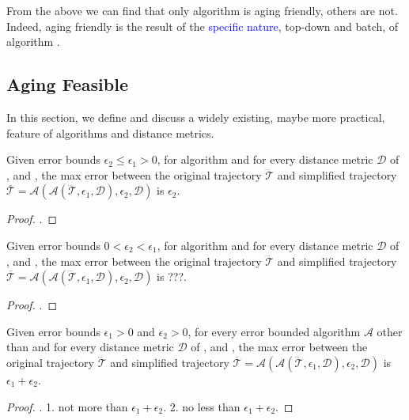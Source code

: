 From the above we can find that only algorithm \dpa is aging friendly, others are not. Indeed, {aging friendly} is the result of the \textcolor{blue}{specific nature}, \ie top-down and batch, of algorithm \dpa.


\subsection{Aging Feasible}
In this section, we define and discuss a widely existing, maybe more practical, feature of \lsa algorithms and distance metrics.


\begin{theorem}
	\label{theo-aging-dp}
	Given error bounds $\epsilon_2 \le \epsilon_1>0$, for \lsa algorithm \dpa and for every distance metric $\mathcal{D}$ of \ped, \sed and \dad, the max error between the original trajectory $\dddot{\mathcal{T}}$ and simplified trajectory $\overline{\mathcal{T}}=\mathcal{A}(\mathcal{A}(\dddot{\mathcal{T}}, \epsilon_1, \mathcal{D}), \epsilon_2, \mathcal{D})$ is $\epsilon_2$.
\end{theorem}

\begin{proof}
	\todo.
\end{proof}

\begin{theorem}
	\label{theo-aging-dp}
	Given error bounds $0<\epsilon_2< \epsilon_1$, for \lsa algorithm \dpa and for every distance metric $\mathcal{D}$ of \ped, \sed and \dad, the max error between the original trajectory $\dddot{\mathcal{T}}$ and simplified trajectory $\overline{\mathcal{T}}=\mathcal{A}(\mathcal{A}(\dddot{\mathcal{T}}, \epsilon_1, \mathcal{D}), \epsilon_2, \mathcal{D})$ is ???.
\end{theorem}

\begin{proof}
	\todo.
\end{proof}

\begin{theorem}
	\label{theo-aging-distance}
	Given error bounds $\epsilon_1>0$ and $\epsilon_2>0$, for every error bounded \lsa algorithm $\mathcal{A}$ other than \dpa and for every distance metric $\mathcal{D}$ of \ped, \sed and \dad, the max error between the original trajectory $\dddot{\mathcal{T}}$ and simplified trajectory $\overline{\mathcal{T}}=\mathcal{A}(\mathcal{A}(\dddot{\mathcal{T}}, \epsilon_1, \mathcal{D}), \epsilon_2, \mathcal{D})$ is $\epsilon_1+ \epsilon_2$.
\end{theorem}

\begin{proof}
	\todo.
	1. not more than $\epsilon_1+ \epsilon_2$.
	2. no less than $\epsilon_1+ \epsilon_2$.
	
\end{proof}